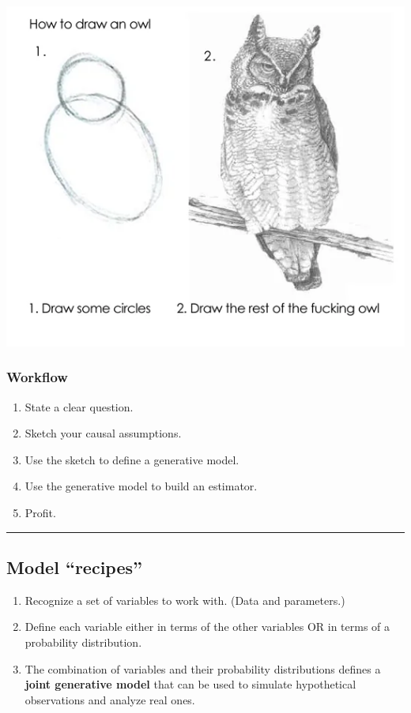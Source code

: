 \documentclass[
  letterpaper,
  DIV=11,
  numbers=noendperiod]{scrartcl}
\providecommand{\tightlist}{%
  \setlength{\itemsep}{0pt}\setlength{\parskip}{0pt}}\usepackage{longtable,booktabs,array}
\begin{document}
\includegraphics{images/2-1_owl.png}

\subsubsection{Workflow}\label{workflow}

\begin{enumerate}
\def\labelenumi{\arabic{enumi}.}
\item
  State a clear question.
\item
  Sketch your causal assumptions.
\item
  Use the sketch to define a generative model.
\item
  Use the generative model to build an estimator.
\item
  Profit.
\end{enumerate}

\begin{center}\rule{0.5\linewidth}{0.5pt}\end{center}

\subsection{Model ``recipes''}\label{model-recipes}

\begin{enumerate}
\def\labelenumi{\arabic{enumi}.}
\tightlist
\item
  Recognize a set of variables to work with. (Data and parameters.)
\item
  Define each variable either in terms of the other variables OR in
  terms of a probability distribution.
\item
  The combination of variables and their probability distributions
  defines a \textbf{joint generative model} that can be used to simulate
  hypothetical observations and analyze real ones.
\end{enumerate}
\end{document}
